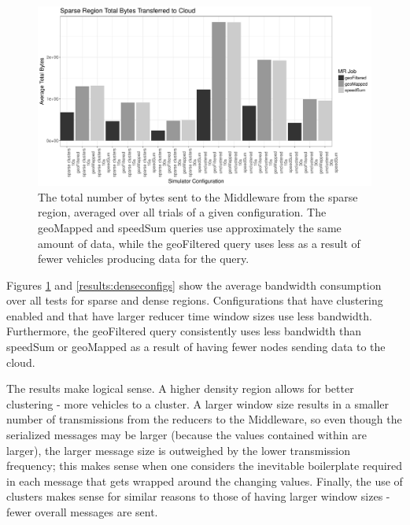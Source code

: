 \documentclass{thesis}
\begin{document}
    \begin{figure}
            \includegraphics[width=\textwidth]{binImages/sparseConfigs.pdf}
            \caption{The total number of bytes sent to the Middleware from the sparse region, averaged over all trials of a given configuration.
                The geoMapped and speedSum queries use approximately the same amount of data, while the geoFiltered
                query uses less as a result of fewer vehicles producing data for the query.}

            \label{results:sparseconfigs}
    \end{figure}

    Figures \ref{results:sparseconfigs} and \ref{results:denseconfigs} show the average bandwidth consumption over
    all tests for sparse and dense regions. Configurations that have clustering enabled and that have larger
    reducer time window sizes use less bandwidth. Furthermore, the geoFiltered query consistently uses less bandwidth
    than speedSum or geoMapped as a result of having fewer nodes sending data to the cloud.

    The results make logical sense. A higher density region allows for better clustering - more vehicles to a cluster.
    A larger window size results in a smaller number of transmissions from the reducers to the Middleware, so even
    though the serialized messages may be larger (because the values contained within are larger), the larger message
    size is outweighed by the lower transmission frequency; this makes sense when one considers the inevitable boilerplate
    required in each message that gets wrapped around the changing values. Finally, the use of clusters makes sense for
    similar reasons to those of having larger window sizes - fewer overall messages are sent.

\end{document}
